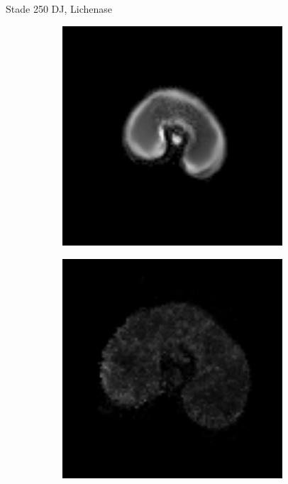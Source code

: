 \documentclass[10pt]{beamer}
\begin{document}
\begin{frame}{Stade 250 DJ, Lichenase}
  \begin{figure}[ht]
    \centering
    \begin{subfigure}[t]{0.33\textwidth}
      \centering
      \includegraphics[width=0.9\textwidth]{fig/stats_250Xyl_density_irm}
    \end{subfigure}%
    \begin{subfigure}[t]{0.33\textwidth}
      \centering
      \includegraphics[width=0.9\textwidth]{fig/stats_250Lich_density}
    \end{subfigure}%
    
  \end{figure}
\end{frame}
\end{document}
